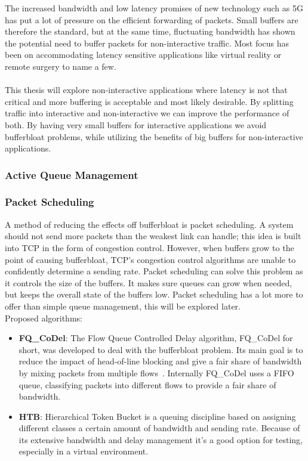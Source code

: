 \documentclass[a4paper,english, 11pt]{report}
\begin{document}
The increased bandwidth and low latency promises of new technology such as 5G has put a lot of pressure on the efficient forwarding of packets. Small buffers are therefore the standard, but at the same time, fluctuating bandwidth has shown the potential need to buffer packets for non-interactive traffic.
Most focus has been on accommodating latency sensitive applications like virtual reality or remote surgery to name a few.\\\\
This thesis will explore non-interactive applications where latency is not that critical and more buffering is acceptable and most likely desirable. By splitting traffic into interactive and non-interactive we can improve the performance of both. By having very small buffers for interactive applications we avoid bufferbloat problems, while utilizing the benefits of big buffers for non-interactive applications.\\

\subsubsection{Active Queue Management}

\subsubsection{Packet Scheduling}
A method of reducing the effects off bufferbloat is packet scheduling. A system should not send more packets than the weakest link can handle; this idea is built into TCP in the form of congestion control. However, when buffers grow to the point of causing bufferbloat, TCP's congestion control algorithms are unable to confidently determine a sending rate. Packet scheduling can solve this problem as it controls the size of the buffers. It makes sure queues can grow when needed, but keeps the overall state of the buffers low. Packet scheduling has a lot more to offer than simple queue management, this will be explored later.\\

Proposed algorithms:
\begin{itemize}
  \item \textbf{FQ\_CoDel}: The Flow Queue Controlled Delay algorithm, FQ\_CoDel for short, was developed to deal with the bufferbloat problem. Its main goal is to reduce the impact of head-of-line blocking and give a fair share of bandwidth by mixing packets from multiple flows~\cite{fq_codel_rfc}. Internally FQ\_CoDel uses a FIFO queue, classifying packets into different flows to provide a fair share of bandwidth.
  \item \textbf{HTB}: Hierarchical Token Bucket is a queuing discipline based on assigning different classes a certain amount of bandwidth and sending rate. Because of its extensive bandwidth and delay management it's a good option for testing, especially in a virtual environment.
\end{itemize}
\end{document}
